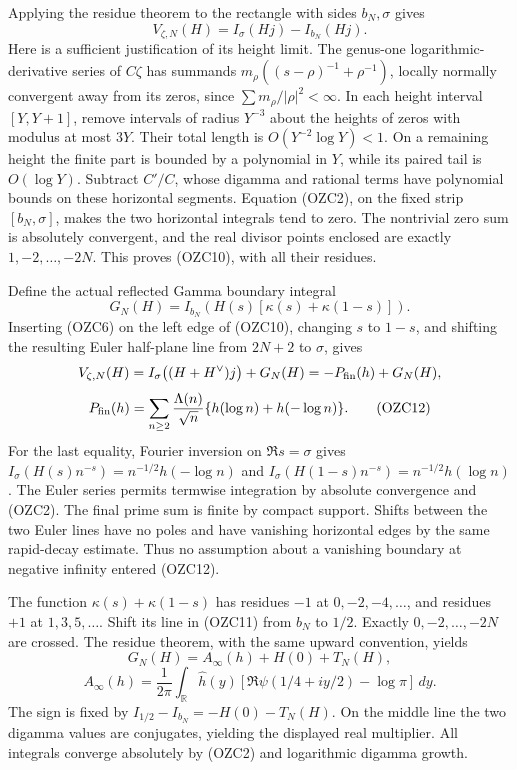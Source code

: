 \documentclass[
  10pt,
  a4paper,
]{article}
\begin{document}
Applying the residue theorem to the rectangle with sides \(b_N,\sigma\)
gives \[
\boxed{V_{\zeta,N}(H)=I_\sigma(Hj)-I_{b_N}(Hj).}
\tag{OZC10}
\] Here is a sufficient justification of its height limit. The genus-one
logarithmic-derivative series of \(C\zeta\) has summands
\(m_\rho((s-\rho)^{-1}+\rho^{-1})\), locally normally convergent away
from its zeros, since \(\sum m_\rho/|\rho|^2<\infty\). In each height
interval \([Y,Y+1]\), remove intervals of radius \(Y^{-3}\) about the
heights of zeros with modulus at most \(3Y\). Their total length is
\(O(Y^{-2}\log Y)<1\). On a remaining height the finite part is bounded
by a polynomial in \(Y\), while its paired tail is \(O(\log Y)\).
Subtract \(C'/C\), whose digamma and rational terms have polynomial
bounds on these horizontal segments. Equation (OZC2), on the fixed strip
\([b_N,\sigma]\), makes the two horizontal integrals tend to zero. The
nontrivial zero sum is absolutely convergent, and the real divisor
points enclosed are exactly \(1,-2,\ldots,-2N\). This proves (OZC10),
with all their residues.

Define the actual reflected Gamma boundary integral \[
G_N(H)=I_{b_N}\!\left(H(s)[\kappa(s)+\kappa(1-s)]\right).
\tag{OZC11}
\] Inserting (OZC6) on the left edge of (OZC10), changing \(s\) to
\(1-s\), and shifting the resulting Euler half-plane line from \(2N+2\)
to \(\sigma\), gives \[
V_{\zeta,N}(H)
=I_\sigma\big((H+H^\vee)j\big)+G_N(H)
=-P_{\rm fin}(h)+G_N(H),
\] \[
P_{\rm fin}(h)=\sum_{n\ge2}\frac{\Lambda(n)}{\sqrt n}
 \{h(\log n)+h(-\log n)\}.
\tag{OZC12}
\] For the last equality, Fourier inversion on \(\Re s=\sigma\) gives
\(I_\sigma(H(s)n^{-s})=n^{-1/2}h(-\log n)\) and
\(I_\sigma(H(1-s)n^{-s})=n^{-1/2}h(\log n)\). The Euler series permits
termwise integration by absolute convergence and (OZC2). The final prime
sum is finite by compact support. Shifts between the two Euler lines
have no poles and have vanishing horizontal edges by the same
rapid-decay estimate. Thus no assumption about a vanishing boundary at
negative infinity entered (OZC12).

The function \(\kappa(s)+\kappa(1-s)\) has residues \(-1\) at
\(0,-2,-4,\ldots\), and residues \(+1\) at \(1,3,5,\ldots\). Shift its
line in (OZC11) from \(b_N\) to \(1/2\). Exactly \(0,-2,\ldots,-2N\) are
crossed. The residue theorem, with the same upward convention, yields \[
\boxed{G_N(H)=A_\infty(h)+H(0)+T_N(H),}
\] \[
A_\infty(h)=\frac1{2\pi}\int_{\mathbb R}\widehat h(y)
 \left[\Re\psi(1/4+iy/2)-\log\pi\right]\,dy.
\tag{OZC13}
\] The sign is fixed by \(I_{1/2}-I_{b_N}=-H(0)-T_N(H)\). On the middle
line the two digamma values are conjugates, yielding the displayed real
multiplier. All integrals converge absolutely by (OZC2) and logarithmic
digamma growth.
\end{document}
